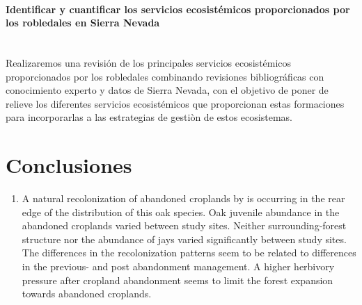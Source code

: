 \paragraph{Identificar y cuantificar los servicios ecosistémicos proporcionados por los robledales en Sierra Nevada}\mbox{} \\
Realizaremos una revisión de los principales servicios ecosistémicos proporcionados por los robledales combinando revisiones bibliográficas con conocimiento experto y datos de Sierra Nevada, con el objetivo de poner de relieve los diferentes servicios ecosistémicos que proporcionan estas formaciones para incorporarlas a las estrategias de gestiòn de estos ecosistemas. 



\section{Conclusiones}\label{sec:conclussions:es}

\begin{enumerate}
\renewcommand{\labelenumi}{\textbf{\textcolor{ctcolormain}{\arabic{enumi}.}}}

    \item A natural recolonization of abandoned croplands by \Qp is occurring in the rear edge of the distribution of this oak species. Oak juvenile abundance in the abandoned croplands varied between study sites. Neither surrounding-forest structure nor the abundance of jays varied significantly between study sites. The differences in the recolonization patterns seem to be related to differences in the previous- and post abandonment management. A higher herbivory pressure after cropland abandonment seems to limit the forest expansion towards abandoned croplands.
    
    
\end{enumerate}